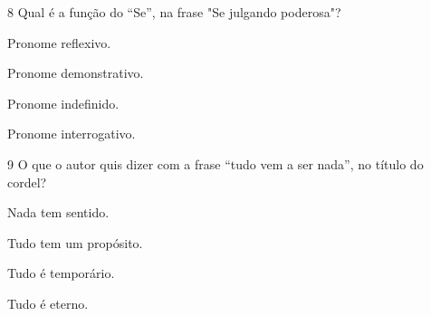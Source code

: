 




\num{8} Qual é a função do ``Se'', na frase "Se julgando poderosa"?

\begin{escolha}
\item
  Pronome reflexivo.
\item
  Pronome demonstrativo.
\item
  Pronome indefinido.
\item
  Pronome interrogativo.
\end{escolha}






\num{9} O que o autor quis dizer com a frase ``tudo vem a ser nada'', no
título do cordel?

\begin{escolha}
\item
  Nada tem sentido.
\item
  Tudo tem um propósito.
\item
  Tudo é temporário.
\item
  Tudo é eterno.
\end{escolha}

